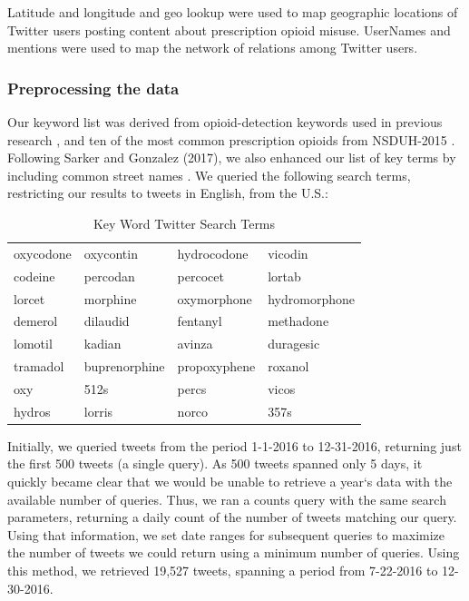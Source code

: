 \documentclass[sigconf]{acmart}
\begin{document}
Latitude and longitude and geo lookup were used to map geographic locations 
of Twitter users posting content about prescription opioid misuse. UserNames 
and mentions were used to map the network of relations among Twitter users. 


\subsubsection{Preprocessing the data} 

Our keyword list was derived from opioid-detection keywords used in previous 
research \cite{chary17, mackey17, lord11}, and ten of the most common 
prescription opioids from NSDUH-2015 \cite{shiverick17}. Following Sarker and 
Gonzalez (2017), we also enhanced our list of key terms by including common 
street names \cite{sarker17}. We queried the following search terms, restricting 
our results to tweets in English, from the U.S.:

\begin{table}[htb]
  \centering
  \caption{Key Word Twitter Search Terms}
  \label{my-label}
  \begin{tabular*}{\columnwidth}{llll}
    \toprule
    oxycodone & oxycontin 	& hydrocodone  & vicodin   	\\
    codeine   & percodan  	& percocet 	& lortab    	\\
    lorcet	& morphine  & oxymorphone  & hydromorphone \\
    demerol   & dilaudid  	& fentanyl 	& methadone 	\\
    lomotil   & kadian    	& avinza   	& duragesic 	\\
    tramadol  & buprenorphine & propoxyphene & roxanol  \\
    oxy   	& 512s      	& percs    	& vicos     	\\ 
    hydros	& lorris    	& norco    	& 357s     	    \\
    \bottomrule
  \end{tabular*}
\end{table}

Initially, we queried tweets from the period 1-1-2016 to 12-31-2016, returning 
just the first 500 tweets (a single query). As 500 tweets spanned only 5 days, 
it quickly became clear that we would be unable to retrieve a year`s data with
the available number of queries. Thus, we ran a counts query with the same 
search parameters, returning a daily count of the number of tweets matching 
our query. Using that information, we set date ranges for subsequent queries 
to maximize the number of tweets we could return using a minimum number of 
queries. Using this method, we retrieved 19,527 tweets, spanning a period from 
7-22-2016 to 12-30-2016.
\end{document}
